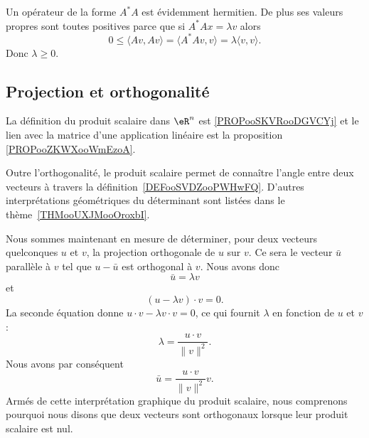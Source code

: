 \begin{remark}      \label{REMooMLBCooTuKFmz}
    Un opérateur de la forme \( A^*A\) est évidemment hermitien. De plus ses valeurs propres sont toutes positives parce que si \( A^*Ax=\lambda v\) alors
    \begin{equation}
        0\leq \langle Av, Av\rangle =\langle A^*Av, v\rangle =\lambda\langle v, v\rangle .
    \end{equation}
    Donc \( \lambda\geq 0\).
\end{remark}

\subsection{Projection et orthogonalité}

La définition du produit scalaire dans \( \eR^n\) est \ref{PROPooSKVRooDGVCYj} et le lien avec la matrice d'une application linéaire est la proposition \ref{PROPooZKWXooWmEzoA}.

\begin{remark}
    Outre l'orthogonalité, le produit scalaire permet de connaître l'angle entre deux vecteurs à travers la définition~\ref{DEFooSVDZooPWHwFQ}. D'autres interprétations géométriques du déterminant sont listées dans le thème~\ref{THMooUXJMooOroxbI}.
\end{remark}

Nous sommes maintenant en mesure de déterminer, pour deux vecteurs quelconques \( u\) et \( v\), la projection orthogonale de \( u\) sur \( v\). Ce sera le vecteur \( \bar u\) parallèle à \( v\) tel que \( u-\bar u\) est orthogonal à \( v\). Nous avons donc
\begin{equation}
    \bar u=\lambda v
\end{equation}
et
\begin{equation}
    (u-\lambda v)\cdot v=0.
\end{equation}
La seconde équation donne \( u\cdot v-\lambda v\cdot v=0\), ce qui fournit \( \lambda\) en fonction de \( u\) et \( v\) :
\begin{equation}
    \lambda=\frac{ u\cdot v }{ \| v \|^2 }.
\end{equation}
Nous avons par conséquent
\begin{equation}
    \bar u=\frac{ u\cdot v }{ \| v \|^2 }v.
\end{equation}
Armés de cette interprétation graphique du produit scalaire, nous comprenons pourquoi nous disons que deux vecteurs sont orthogonaux lorsque leur produit scalaire est nul.

